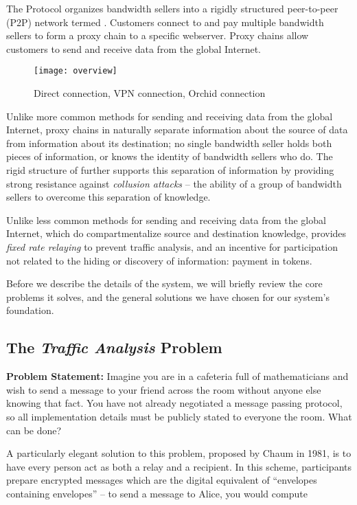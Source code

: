 The \Orchid{} Protocol organizes bandwidth sellers into a rigidly
structured peer-to-peer (P2P) network termed \tOM{}. Customers connect to
\tOM{} and pay multiple bandwidth sellers to form a proxy chain to a
specific webserver. Proxy chains allow customers to send and receive
data from the global Internet.

\begin{figure}[htbp]
  \centering
  \texttt{[image: overview]}
  \caption{Direct connection, VPN connection, Orchid connection}
\end{figure}

Unlike more common methods for sending and receiving data from the
global Internet, proxy chains in \tOM{} naturally separate information
about the source of data from information about its destination; no
single bandwidth seller holds both pieces of information, or knows the
identity of bandwidth sellers who do. The rigid structure of \tOM{}
further supports this separation of information by providing strong
resistance against \emph{collusion attacks} -- the ability of a group
of bandwidth sellers to overcome this separation of knowledge.

Unlike less common methods for sending and receiving data from the
global Internet, which do compartmentalize source and destination
knowledge, \tOM{} provides \emph{fixed rate relaying} to prevent
traffic analysis, and an incentive for participation not related to
the hiding or discovery of information: payment in tokens.

Before we describe the details of the system, we will briefly review
the core problems it solves, and the general solutions we have chosen
for our system's foundation.

\subsection{The \emph{Traffic Analysis} Problem}

\textbf{Problem Statement:} Imagine you are in a cafeteria full of
mathematicians and wish to send a message to your friend across the
room without anyone else knowing that fact. You have not already
negotiated a message passing protocol, so all implementation details
must be publicly stated to everyone the room. What can be done?

A particularly elegant solution to this problem, proposed by Chaum in
1981\cite{chaum-mix}, is to have every person act as both a relay and
a recipient. In this scheme, participants prepare encrypted messages
which are the digital equivalent of ``envelopes containing envelopes''
-- to send a message to Alice, you would compute

